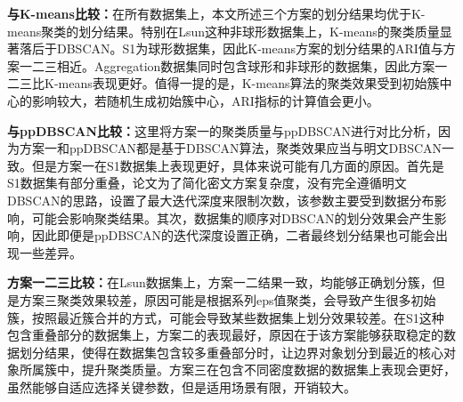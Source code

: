 \begin{compactitem}
	\item \textbf{与K-means比较：}在所有数据集上，本文所述三个方案的划分结果均优于K-means聚类的划分结果。特别在Lsun这种非球形数据集上，K-means的聚类质量显著落后于DBSCAN。S1为球形数据集，因此K-means方案的划分结果的ARI值与方案一二三相近。Aggregation数据集同时包含球形和非球形的数据集，因此方案一二三比K-means表现更好。值得一提的是，K-means算法的聚类效果受到初始簇中心的影响较大，若随机生成初始簇中心，ARI指标的计算值会更小。
	\item
	\textbf{与ppDBSCAN比较：}这里将方案一的聚类质量与ppDBSCAN进行对比分析，因为方案一和ppDBSCAN都是基于DBSCAN算法，聚类效果应当与明文DBSCAN一致。但是方案一在S1数据集上表现更好，具体来说可能有几方面的原因。首先是S1数据集有部分重叠，论文\cite{bozdemir2021privacy}为了简化密文方案复杂度，没有完全遵循明文DBSCAN的思路，设置了最大迭代深度来限制次数，该参数主要受到数据分布影响，可能会影响聚类结果。其次，数据集的顺序对DBSCAN的划分效果会产生影响，因此即便是ppDBSCAN的迭代深度设置正确，二者最终划分结果也可能会出现一些差异。
	\item
	\textbf{方案一二三比较：}在Lsun数据集上，方案一二结果一致，均能够正确划分簇，但是方案三聚类效果较差，原因可能是根据系列eps值聚类，会导致产生很多初始簇，按照最近簇合并的方式，可能会导致某些数据集上划分效果较差。在S1这种包含重叠部分的数据集上，方案二的表现最好，原因在于该方案能够获取稳定的数据划分结果，使得在数据集包含较多重叠部分时，让边界对象划分到最近的核心对象所属簇中，提升聚类质量。方案三在包含不同密度数据的数据集上表现会更好，虽然能够自适应选择关键参数，但是适用场景有限，开销较大。
\end{compactitem}

